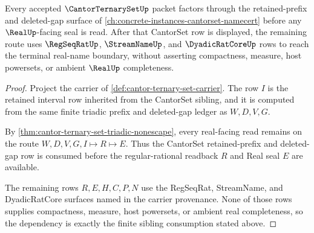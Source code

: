\begin{theorem}
\label{thm:cantor-ternary-set-cantor-set-dependency}
Every accepted $\CantorTernarySetUp$ packet factors through the retained-prefix and deleted-gap surface of \autoref{ch:concrete-instances-cantorset-namecert} before any $\RealUp$-facing seal is read. After that CantorSet row is displayed, the remaining route uses $\RegSeqRatUp$, $\StreamNameUp$, and $\DyadicRatCoreUp$ rows to reach the terminal real-name boundary, without asserting compactness, measure, host powersets, or ambient $\RealUp$ completeness.
\end{theorem}
\begin{proof}
Project the carrier of \autoref{def:cantor-ternary-set-carrier}. The row $I$ is the retained interval row inherited from the CantorSet sibling, and it is computed from the same finite triadic prefix and deleted-gap ledger as $W,D,V,G$.

By \autoref{thm:cantor-ternary-set-triadic-nonescape}, every real-facing read remains on the route $W,D,V,G,I\longmapsto R\longmapsto E$. Thus the CantorSet retained-prefix and deleted-gap row is consumed before the regular-rational readback $R$ and Real seal $E$ are available.

The remaining rows $R,E,H,C,P,N$ use the RegSeqRat, StreamName, and DyadicRatCore surfaces named in the carrier provenance. None of those rows supplies compactness, measure, host powersets, or ambient real completeness, so the dependency is exactly the finite sibling consumption stated above.
\end{proof}


\begin{closurestatus}{\CantorTernarySetUp}
  \theoryclosure{\seedClosure}
  \formalstatus{\unformalizedV}
\end{closurestatus}
